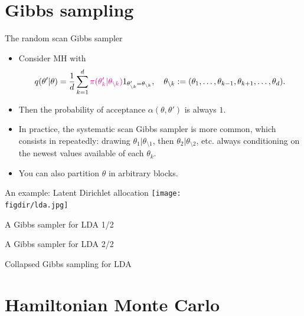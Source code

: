 \documentclass[10pt]{beamer}
\def\figdir{Figures}
\renewcommand\un[1]{\textcolor{magenta}{#1}}
\begin{document}
\section{Gibbs sampling}
\begin{frame}{The random scan Gibbs sampler}
\begin{itemize}
\item Consider MH with
$$
q(\theta'\vert\theta) = \frac1d \sum_{k=1}^d \un{\pi(\theta'_k\vert \theta_{\setminus k})} 1_{\theta'_{\setminus k} = \theta_{\setminus k}}, \quad \theta_{\setminus k}:= (\theta_1,\dots,\theta_{k-1},\theta_{k+1},\dots,\theta_d).
$$
\item Then the probability of acceptance $\alpha(\theta,\theta')$ is always $1$.
\vspace{2cm}
\vfill
\item In practice, the systematic scan Gibbs sampler is more common, which consists in repeatedly: drawing $\theta_1\vert\theta_{\setminus 1}$, then $\theta_2\vert\theta_{\setminus 2}$, etc. always conditioning on the newest values available of each $\theta_k$.
\item You can also partition $\theta$ in arbitrary blocks.
\end{itemize}
\end{frame}

\begin{frame}{An example: Latent Dirichlet allocation}
\centering
\texttt{[image: \\figdir/lda.jpg]}
\vfill
\end{frame}

\begin{frame}{A Gibbs sampler for LDA 1/2}

\end{frame}

\begin{frame}{A Gibbs sampler for LDA 2/2}

\end{frame}

\begin{frame}{Collapsed Gibbs sampling for LDA}

\end{frame}

\section{Hamiltonian Monte Carlo}
\end{document}
